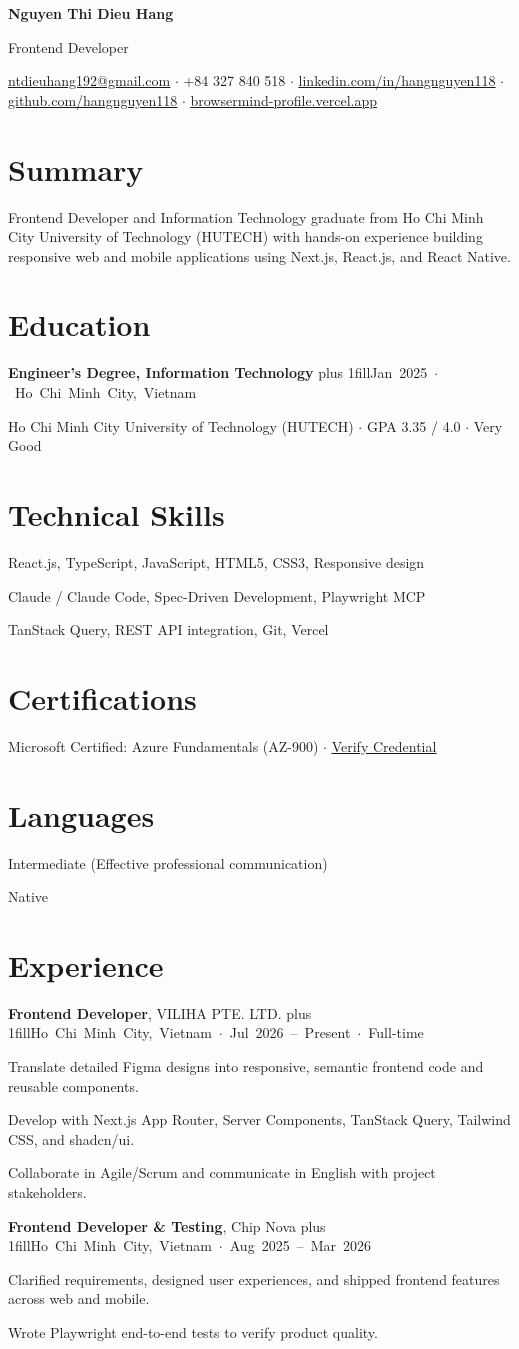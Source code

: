 \documentclass[11pt,a4paper]{article}
\let\cvhref\href
\renewcommand{\href}[2]{\cvhref{#1}{\uline{#2}}}
\newcommand{\cvname}[1]{{\centering\fontsize{18}{20}\selectfont\bfseries #1\par}\vspace{0.15em}}
\newcommand{\cvheadline}[1]{{\centering\large #1\par}\vspace{0.2em}}
\newcommand{\cvcontact}[1]{{\centering\small\color{muted}#1\par}\vspace{0.15em}}
\newcommand{\cvsection}[1]{\section*{#1}}
\newcommand{\cvsummary}[1]{#1\par\vspace{0.1em}}
\newcommand{\cvfill}{\hskip 0pt plus 1fill\relax}
\newcommand{\cvitem}[2]{%
  \vspace{0.3em}%
  #1\cvfill\mbox{\footnotesize\color{muted}#2}\par
}
\newcommand{\cvsubline}[1]{#1\par}
\newcommand{\cvskill}[2]{\vspace{0.08em}{\bfseries #1:} #2\par}
\newcommand{\cvplain}[1]{\vspace{0.1em}#1\par}
\begin{document}
\cvname{Nguyen Thi Dieu Hang}
\cvheadline{Frontend Developer}
\cvcontact{\href{mailto:ntdieuhang192@gmail.com}{ntdieuhang192@gmail.com} $\cdot$ +84 327 840 518 $\cdot$ \href{https://www.linkedin.com/in/hangnguyen118}{linkedin.com/in/hangnguyen118} $\cdot$ \href{https://github.com/hangnguyen118}{github.com/hangnguyen118} $\cdot$ \href{https://browsermind-profile.vercel.app}{browsermind-profile.vercel.app}}
\cvsection{Summary}
\cvsummary{Frontend Developer and Information Technology graduate from Ho Chi Minh City University of Technology (HUTECH) with hands-on experience building responsive web and mobile applications using Next.js, React.js, and React Native.}
\cvsection{Education}
\cvitem{\textbf{Engineer's Degree, Information Technology}}{Jan 2025 $\cdot$ Ho Chi Minh City, Vietnam}
\cvsubline{Ho Chi Minh City University of Technology (HUTECH) $\cdot$ GPA 3.35 / 4.0 $\cdot$ Very Good}
\cvsection{Technical Skills}
\cvskill{Frontend}{React.js, TypeScript, JavaScript, HTML5, CSS3, Responsive design}
\cvskill{AI workflows}{Claude / Claude Code, Spec-Driven Development, Playwright MCP}
\cvskill{Data \& delivery}{TanStack Query, REST API integration, Git, Vercel}
\cvsection{Certifications}
\cvplain{Microsoft Certified: Azure Fundamentals (AZ-900) $\cdot$ \href{https://learn.microsoft.com/api/credentials/share/vi-vn/hangnguyen1108/306DA7D144E07FF7?sharingId=C357452C5EB8224A}{Verify Credential}}
\cvsection{Languages}
\cvskill{English}{Intermediate (Effective professional communication)}
\cvskill{Vietnamese}{Native}
\cvsection{Experience}
\cvitem{\textbf{Frontend Developer}, VILIHA PTE. LTD.}{Ho Chi Minh City, Vietnam $\cdot$ Jul 2026 – Present $\cdot$ Full-time}
\begin{cvbullets}
  \item Translate detailed Figma designs into responsive, semantic frontend code and reusable components.
  \item Develop with Next.js App Router, Server Components, TanStack Query, Tailwind CSS, and shadcn/ui.
  \item Collaborate in Agile/Scrum and communicate in English with project stakeholders.
\end{cvbullets}
\cvitem{\textbf{Frontend Developer \& Testing}, Chip Nova}{Ho Chi Minh City, Vietnam $\cdot$ Aug 2025 – Mar 2026}
\begin{cvbullets}
  \item Clarified requirements, designed user experiences, and shipped frontend features across web and mobile.
  \item Wrote Playwright end-to-end tests to verify product quality.
\end{cvbullets}
\end{document}
